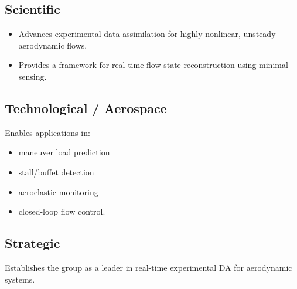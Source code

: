 \documentclass[12pt,a4paper]{article}
\begin{document}
\subsection*{Scientific}

\begin{itemize}
    \item Advances experimental data assimilation for highly nonlinear, unsteady aerodynamic flows.
    \item Provides a framework for real-time flow state reconstruction using minimal sensing.
\end{itemize}

\subsection*{Technological / Aerospace}

Enables applications in:

\begin{itemize}
    \item maneuver load prediction
    \item stall/buffet detection
    \item aeroelastic monitoring
    \item closed-loop flow control.
\end{itemize}

\subsection*{Strategic}

Establishes the group as a leader in real-time experimental DA for aerodynamic systems.
\end{document}

